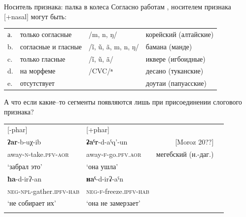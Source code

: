 \begin{frame}{Носитель признака: палка в колеса}
Согласно работам \citep{cohn93}, \citep{clements03} носителем признака [+nasal] могут быть:\\
\begin{tabular}{llll}
а. & только согласные & /m, n, ŋ/ & корейский (алтайские) \\ 
b. & согласные и гласные & /ĩ, ũ, ã, m, n, ŋ/ & бамана (манде) \\ 
c. & только гласные & /ĩ, ũ, ã/ & иквере (игбоидные) \\ 
d. & на морфеме & /CVC/ⁿ & десано (туканские) \\ 
e. & отсутствует &  & доутаи (папуасские) \\ 
\end{tabular}
\vfill
А что если какие–то сегменты появляются лишь при присоединении слогового признака?
\begin{tabular}{llrr} \hspace{-3mm}
[-phar] & [+phar] &\\ \hspace{-3mm}
\textbf{ʔar}-b-uχ-ib & \textbf{ʡaˤr}-d-aˤq'-un & [Moroz 20??]\\ \hspace{-3mm}
away-\textsc{n}-take.\textsc{pfv-aor} & away-\textsc{f}-go.\textsc{pfv.aor}   &мегебский (н.-даг.) \\ \hspace{-3mm}
‘забрал это’ & ‘она ушла’ & \vspace{2mm} \\ \hspace{-3mm}
\textbf{ħa}-d-irʔ-an & \textbf{ʜaˤ}-d-irʡ-aˤn &\\ \hspace{-3mm}
\textsc{neg-npl-}gather.\textsc{ipfv-hab} &  \textsc{neg-f-}freeze.\textsc{ipfv-hab} &\\ \hspace{-3mm}
‘не собирает их’ & ‘она не замерзает’ &\\ \hspace{-3mm}
\end{tabular} 
\end{frame}
